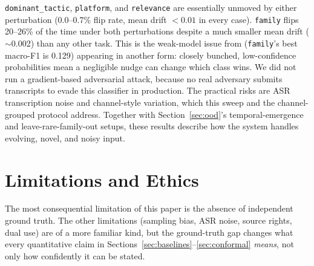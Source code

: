 \documentclass[preprint,12pt]{elsarticle}
\begin{document}
\texttt{dominant\_tactic}, \texttt{platform}, and \texttt{relevance} are
essentially unmoved by either perturbation (0.0--0.7\% flip rate, mean
drift $<0.01$ in every case). \texttt{family} flips 20--26\% of the time
under both perturbations despite a much smaller mean drift ($\sim$0.002)
than any other task. This is the weak-model issue from 
(\texttt{family}'s best macro-F1 is 0.129) appearing in another form: closely
bunched, low-confidence probabilities mean a negligible nudge can change which
class wins. We did not run a gradient-based adversarial attack, because no real
adversary submits transcripts to evade this classifier in production. The
practical risks are ASR transcription noise and channel-style variation, which
this sweep and the channel-grouped protocol address. Together with
Section~\ref{sec:ood}'s temporal-emergence and leave-rare-family-out setups,
these results describe how the system handles evolving, novel, and noisy input.

\section{Limitations and Ethics}
\label{sec:limitations}

The most consequential limitation of this paper is the absence of independent
ground truth. The other limitations (sampling bias, ASR noise, source rights,
dual use) are of a more familiar kind, but the ground-truth gap changes what
every quantitative claim in Sections~\ref{sec:baselines}--\ref{sec:conformal}
\emph{means}, not only how confidently it can be stated.
\end{document}
